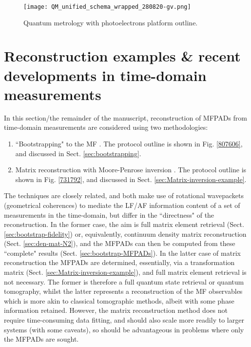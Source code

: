 \documentclass[10pt]{article}
\begin{document}

\begin{figure}[]
\begin{center}
\texttt{[image: QM\_unified\_schema\_wrapped\_280820-gv.png]}
\caption{Quantum metrology with photoelectrons platform outline.\label{239231}}
\end{center}
\end{figure}

\section{Reconstruction examples \& recent developments in time-domain measurements\label{sec:Recon}}

In this section/the remainder of the manuscript, reconstruction of MFPADs from time-domain measurements are considered using two methodologies:

\begin{enumerate}
\item ``Bootstrapping" to the MF \cite{hockett2018QMP1,hockett2018QMP2,marceau2017MolecularFrameReconstruction}. The protocol outline is shown in Fig. \ref{807606}, and discussed in Sect. \ref{sec:bootstrapping}.
\item Matrix reconstruction with Moore-Penrose inversion \cite{gregory2021MolecularFramePhotoelectron}. The protocol outline is shown in Fig. \ref{731792}, and discussed in Sect. \ref{sec:Matrix-inversion-example}.
\end{enumerate}

The techniques are closely related, and both make use of rotational wavepackets (geometrical coherences) to mediate the LF/AF information content of a set of measurements in the time-domain, but differ in the ``directness" of the reconstruction. In the former case, the aim is full matrix element retrieval (Sect. \ref{sec:bootstrap-fidelity}) or, equivalently, continuum density matrix reconstruction (Sect. \ref{sec:den-mat-N2}), and the MFPADs can then be computed from these ``complete" results (Sect. \ref{sec:bootstrap-MFPADs}). In the latter case of matrix reconstruction the MFPADs are determined, essentially, via a transformation matrix (Sect. \ref{sec:Matrix-inversion-example}), and full matrix element retrieval is not necessary. The former is therefore a full quantum state retrieval or quantum tomography, whilst the latter represents a reconstruction of the MF observables which is more akin to classical tomographic methods, albeit with some phase information retained. %
However, the matrix reconstruction method does not require time-consuming data fitting, and should also scale more readily to larger systems (with some caveats), so should be advantageous in problems where only the MFPADs are sought.
\end{document}
